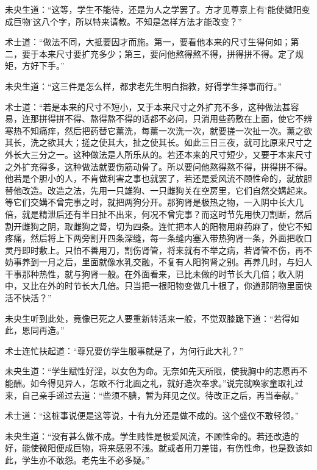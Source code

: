 \documentclass[a4paper,12pt,UTF8,twoside]{ctexbook}
\begin{document}
未央生道：“这等，学生不能待，还是为人之学罢了。方才见尊禀上有‘能使微阳变成巨物’这八个字，所以特来请教。不知是怎样方法才能改变？”

术士道：“做法不同，大抵要因才而施。第一，要看他本来的尺寸生得何如；第二，要于本来尺寸要扩充多少；第三，要问他熬得熬不得，拼得拼不得。定了规矩，方好下手。”

未央生道：“这三件是怎么样，都求老先生明白指教，好得学生择事而行。”

术士道：“若是本来的尺寸不短小，又于本来尺寸之外扩充不多，这种做法甚容易，连那拼得拼不得、熬得熬不得的话都不必问，只消用些药敷在上面，使它不辨寒热不知痛痒，然后把药替它薰洗，每薰一次洗一次，就要搓一次扯一次。薰之欲其长，洗之欲其大；搓之使其大，扯之使其长。如此三日三夜，就可比原来尺寸之外长大三分之一。这种做法是人所乐从的。若还本来的尺寸短少，又要于本来尺寸之外扩充得多，这种做法就要伤筋动骨了。所以要问他熬得熬不得，拼得拼不得。他若是个胆小的人，不肯做利害之事也就罢了，若还是爱风流不顾性命的，就放胆替他改造。改造之法，先用一只雄狗、一只雌狗关在空房里，它们自然交媾起来。等它们交媾不曾完事之时，就把两狗分开。那狗肾是极热之物，一入阴中长大几倍，就是精泄后还有半日扯不出来，何况不曾完事？而这时节先用快刀割断，然后割开雌狗之阴，取雌狗之肾，切为四条。连忙把本人的阳物用麻药麻了，使它不知疼痛，然后将上下两旁割开四条深缝，每一条缝内塞入带热狗肾一条，外面把收口灵丹即时敷上。只怕不善用刀，割伤肾管，将来就有不举之病，若肾管不伤，再不妨事养到一月之后，里面就像水乳交融，不复有人阳狗肾之别。再养几时，与妇人干事那种热性，就与狗肾一般。在外面看来，已比未做的时节长大几倍；收入阴中，又比在外的时节长大几倍。只当把一根阳物变做几十根了，你道那阴物里面快活不快活？”

未央生听到此处，竟像已死之人要重新转活来一般，不觉双膝跪下道：“若得如此，恩同再造。”

术士连忙扶起道：“尊兄要仿学生服事就是了，为何行此大礼？”

未央生道：“学生赋性好淫，以女色为命。无奈如先天所限，使我胸中的志愿再不能酬。如今得见异人，怎敢不行北面之礼，就好造次奉求。”说完就唤家童取礼过来，自己亲手递过去道：“些须不腆，暂为拜见之仪。待改正之后，再当奉献。”

术士道：“这桩事说便是这等说，十有九分还是做不成的。这个盛仪不敢轻领。”

未央生道：“没有甚么做不成。学生贱性是极爱风流，不顾性命的。若还改造的好，能使微阳便成巨物，将来感恩不浅。就或者用刀差错，有伤性命，也是数该如此，学生亦不敢怨。老先生不必多疑。”
\end{document}

